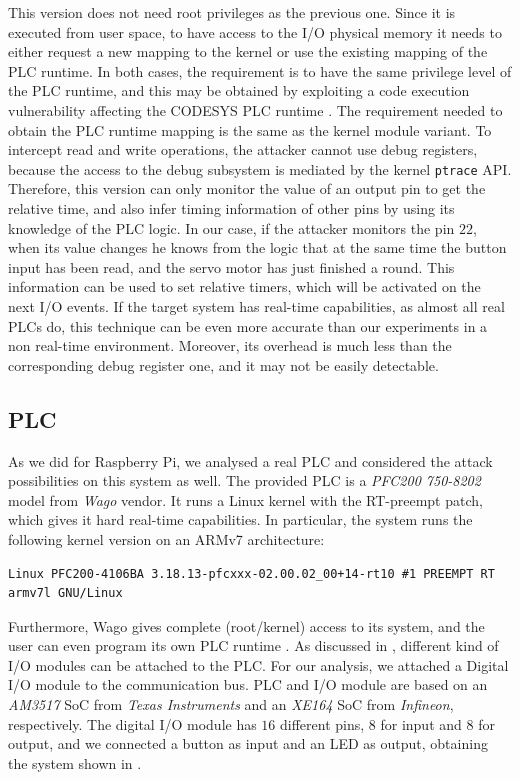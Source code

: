 This version does not need root privileges as the previous one. Since it is executed from user space, to have access to the I/O physical memory it needs to either
request a new mapping to the kernel or use the existing mapping of the PLC runtime. In both cases, the requirement is to have the same privilege level of the PLC runtime,
and this may be obtained by exploiting a code execution vulnerability affecting the CODESYS PLC runtime \cite{abb-codesys,codesys-server}.
The requirement needed to obtain the PLC runtime mapping is the same as the kernel module variant.
To intercept read and write operations, the attacker cannot use debug registers, because the access to the debug subsystem is mediated by the kernel \verb|ptrace| API.
Therefore, this version can only monitor the value of an output pin to get the relative time, and also infer timing information of other pins
by using its knowledge of the PLC logic. In our case, if the attacker monitors the pin $22$, when its value changes he knows from the logic
that at the same time the button input has been read, and the servo motor has just finished a round.
This information can be used to set relative timers, which will be activated on the next I/O events.
If the target system has real-time capabilities, as almost all real PLCs do, this technique can be even more accurate than our experiments in a non real-time environment.
Moreover, its overhead is much less than the corresponding debug register one, and it may not be easily detectable.


\subsection{PLC}
\label{sec:attack_plc}

As we did for Raspberry Pi, we analysed a real PLC and considered the attack possibilities on this system as well.
The provided PLC is a \emph{PFC200 750-8202} model from \emph{Wago} vendor. It runs a Linux kernel with the RT-preempt patch, which gives it hard real-time capabilities.
In particular, the system runs the following kernel version on an ARMv7 architecture:
\begin{Verbatim}[fontsize=\small]
	Linux PFC200-4106BA 3.18.13-pfcxxx-02.00.02_00+14-rt10 #1 PREEMPT RT armv7l GNU/Linux
\end{Verbatim}
Furthermore, Wago gives complete (root/kernel) access to its system, and the user can even program its own PLC runtime \cite{wago_linux}.
As discussed in , different kind of I/O modules can be attached to the PLC. For our analysis, we attached a Digital I/O module to the communication bus.
PLC and I/O module are based on an \emph{AM3517} SoC from \emph{Texas Instruments} and an \emph{XE164} SoC from \emph{Infineon}, respectively.
The digital I/O module has $16$ different pins, $8$ for input and $8$ for output, and we connected a button as input and an LED as output,
obtaining the system shown in .

